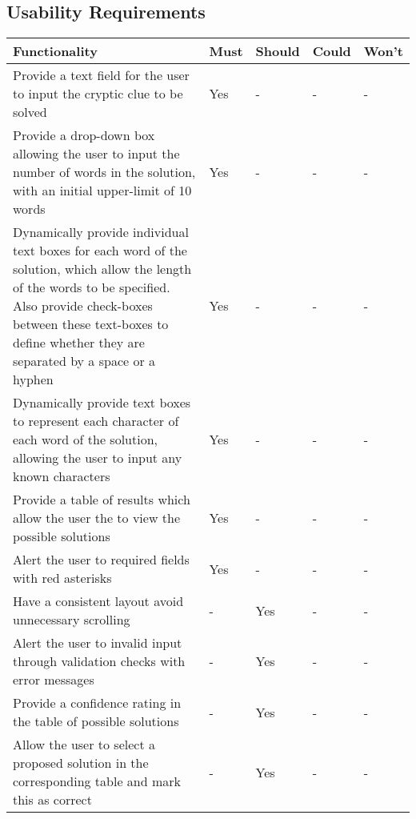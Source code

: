 \subsection{Usability Requirements}

\begin{table}[H]
	\centering
	\small
    \begin{tabular}{|p{9.3cm}|p{1.3cm}|p{1.3cm}|p{1.3cm}|p{1.3cm}|}
    \hline
    \textbf{Functionality} & \textbf{Must} & \textbf{Should} & \textbf{Could} & \textbf{Won't} \\ \hline

    Provide a text field for the user to input the cryptic clue to be solved &
    Yes & - & - & - \\ \hline

    Provide a drop-down box allowing the user to input the number of words in the solution, with an initial upper-limit of 10 words &
    Yes & - & - & - \\ \hline

    Dynamically provide individual text boxes for each word of the solution, which allow the length of the words to be specified. Also provide check-boxes between these text-boxes to define whether they are separated by a space or a hyphen &
    Yes & - & - & - \\ \hline

    Dynamically provide text boxes to represent each character of each word of the solution, allowing the user to input any known characters &
    Yes & - & - & - \\ \hline

    Provide a table of results which allow the user the to view the possible solutions &
    Yes & - & - & - \\ \hline

    Alert the user to required fields with red asterisks &
    Yes & - & - & - \\ \hline

    Have a consistent layout avoid unnecessary scrolling &
    - & Yes & - & - \\ \hline

    Alert the user to invalid input through validation checks with error messages &
    - & Yes & - & - \\ \hline

    Provide a confidence rating in the table of possible solutions &
    - & Yes & - & - \\ \hline

    Allow the user to select a proposed solution in the corresponding table and mark this as correct &
    - & Yes & - & - \\ \hline


\end{tabular}
\end{table}

